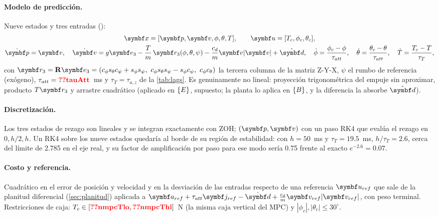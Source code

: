 \paragraph{Modelo de predicción.} Nueve estados y tres entradas
():
\begin{gather}
\vect x=[\vect p,\vect v,\phi,\theta,T],\qquad \vect u=[T_c,\phi_c,\theta_c],\nonumber\\
\dot{\vect p}=\vect v,\quad
\dot{\vect v}=g\eu-\frac{T}{m}\,\vect r_3(\phi,\theta,\psi)-\frac{c_d}{m}\vect v|\vect v|+\hat{\vect d},\quad
\dot\phi=\frac{\phi_c-\phi}{\tau_{att}},\quad
\dot\theta=\frac{\theta_c-\theta}{\tau_{att}},\quad
\dot T=\frac{T_c-T}{\tau_T},
\label{eq:nmpc}
\end{gather}
con $\vect r_3=\R\eu=(c_\phi s_\theta c_\psi+s_\phi s_\psi,\ c_\phi s_\theta s_\psi-s_\phi c_\psi,\ c_\phi c_\theta)$
la tercera columna de la matriz Z-Y-X, $\psi$ el rumbo de referencia
(exógeno), $\tau_{att}=\val{tauAtt}$~ms y $\tau_T=\tau_{a,z}$ de la
\cref{tab:lags}. Es genuinamente no lineal: proyección trigonométrica del
empuje sin aproximar, producto $T\vect r_3$ y arrastre cuadrático (aplicado en
$\{E\}$, supuesto; la planta lo aplica en $\{B\}$, y la diferencia la absorbe
$\hat{\vect d}$).

\paragraph{Discretización.} Los tres estados de rezago son lineales y se
integran exactamente con ZOH; $(\vect p,\vect v)$ con un paso RK4 que evalúa
el rezago en $0,h/2,h$. Un RK4 sobre los nueve estados quedaría al borde de
su región de estabilidad: con $h=50$~ms y $\tau_T=19.5$~ms, $h/\tau_T=2.6$,
cerca del límite de 2.785 en el eje real, y su factor de amplificación por
paso para ese modo sería 0.75 frente al exacto $e^{-2.6}=0.07$.

\paragraph{Costo y referencia.} Cuadrático en el error de posición y
velocidad y en la desviación de las entradas respecto de una referencia
$\vect u_{ref}$ que sale de la planitud diferencial
(\cref{sec:planitud}) aplicada a $\vect a_{ref}+\tau_{att}\vect j_{ref}-\hat{\vect d}+\frac{c_d}{m}\vect v_{ref}|\vect v_{ref}|$,
con peso terminal. Restricciones de caja:
$T_c\in[\val{nmpcTlo},\val{nmpcThi}]$~N (la misma caja vertical del MPC) y
$|\phi_c|,|\theta_c|\le30^\circ$.

